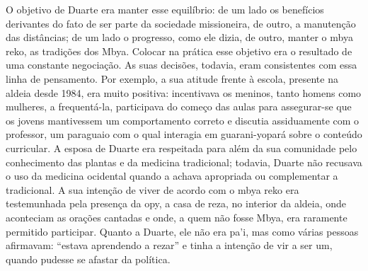 {{O objetivo de Duarte era manter esse equilíbrio: de um lado os
benefícios derivantes do fato de ser parte da sociedade missioneira, de
outro, a manutenção das distâncias; de um lado o progresso, como ele
dizia, de outro, manter o mbya reko, as tradições dos Mbya. Colocar na
prática esse objetivo era o resultado de uma constante negociação. As
suas decisões, todavia, eram consistentes com essa linha de pensamento.
Por exemplo, a sua atitude frente à escola, presente na aldeia desde
1984, era muito positiva: incentivava os meninos, tanto homens como
mulheres, a frequentá-la, participava do começo das aulas para
assegurar-se que os jovens mantivessem um comportamento correto e
discutia assiduamente com o professor, um paraguaio com o qual
interagia em guarani-yopará sobre o conteúdo curricular. A esposa de
Duarte era respeitada para além da sua comunidade pelo conhecimento das
plantas e da medicina tradicional; todavia, Duarte não recusava o uso da
medicina ocidental quando a achava apropriada ou complementar a
tradicional. A sua intenção de viver de acordo com o mbya reko era
testemunhada pela presença da opy, a casa de reza, no interior da
aldeia, onde aconteciam as orações cantadas e onde, a quem não fosse
Mbya, era raramente permitido participar. Quanto a Duarte, ele não era
pa’i, mas como várias pessoas afirmavam: ``estava aprendendo a rezar'' e
tinha a intenção de vir a ser um, quando pudesse se afastar da
política.

}}
